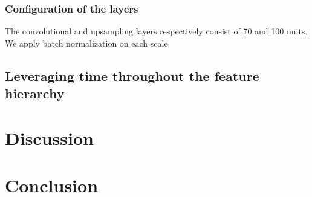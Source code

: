 \subsubsection{Configuration of the layers}
The convolutional and upsampling layers respectively consist of 70 and 100
units. We apply batch normalization on each scale.

\subsection{Leveraging time throughout the feature hierarchy}
\label{ssec:analysis}

\section{Discussion}
\label{sec:disc}
\section{Conclusion}
